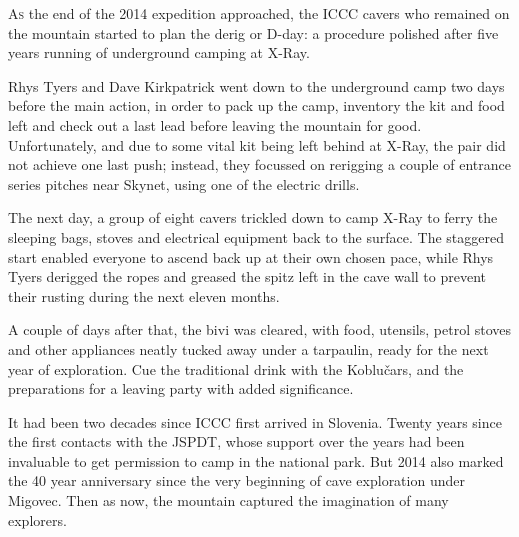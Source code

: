 \thispagestyle{endchapter}

\begin{tcolorbox}
\vspace{80pt}

	\lettrine{A}{s} the end of the 2014 expedition approached, the ICCC cavers who remained on the mountain started to plan the derig or D-day: a procedure polished after five years running of underground camping at X-Ray. 

	Rhys Tyers and Dave Kirkpatrick went down to the underground camp two days before the main action, in order to pack up the camp, inventory the kit and food left and check out a last lead before leaving the mountain for good. Unfortunately, and due to some vital kit being left behind at X-Ray, the pair did not achieve one last push; instead, they focussed on rerigging a couple of entrance series pitches near Skynet, using one of the electric drills. 

	The next day, a group of eight cavers trickled down to camp X-Ray to ferry the sleeping bags, stoves and electrical equipment back to the surface. The staggered start enabled everyone to ascend back up at their own chosen pace, while Rhys Tyers derigged the ropes and greased the spitz left in the cave wall to prevent their rusting during the next eleven months.

	A couple of days after that, the bivi was cleared, with food, utensils, petrol stoves and other appliances neatly tucked away under a tarpaulin, ready for the next year of exploration. Cue the traditional drink with the Koblu\v{c}ars, and the preparations for a leaving party with added significance.

	It had been two decades since ICCC first arrived in Slovenia. Twenty years since the first contacts with the JSPDT, whose support over the years had been invaluable to get permission to camp in the national park. But 2014 also marked the  40 year anniversary since the very beginning of cave exploration under Migovec. Then as now, the mountain captured the imagination of many explorers.

	

\end{tcolorbox}

